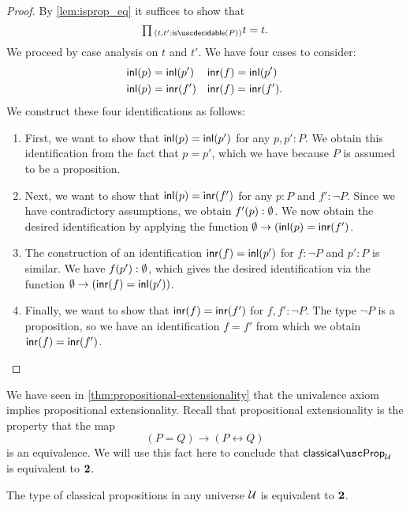 \begin{proof}
  By \cref{lem:isprop_eq} it suffices to show that
  \begin{equation*}
    \prd{t,t':\isdecidable(P)}t=t.
  \end{equation*}
  We proceed by case analysis on $t$ and $t'$. We have four cases to consider:
  \begin{align*}
    {\mathsf{inl}}(p) & ={\mathsf{inl}}(p') & {\mathsf{inr}}(f) & ={\mathsf{inl}}(p') \\
    {\mathsf{inl}}(p) & ={\mathsf{inr}}(f') & {\mathsf{inr}}(f) & ={\mathsf{inr}}(f').
  \end{align*}
  We construct these four identifications as follows:
  \begin{enumerate}
  \item First, we want to show that ${\mathsf{inl}}(p)={\mathsf{inl}}(p')$ for any $p,p':P$. We obtain this identification from the fact that $p=p'$, which we have because $P$ is assumed to be a proposition.
  \item Next, we want to show that ${\mathsf{inl}}(p)={\mathsf{inr}}(f')$ for any $p:P$ and $f':\neg P$. Since we have contradictory assumptions, we obtain $f'(p):\emptyset$. We now obtain the desired identification by applying the function $\emptyset \to ({\mathsf{inl}}(p)={\mathsf{inr}}(f')$.
  \item The construction of an identification ${\mathsf{inr}}(f)={\mathsf{inl}}(p')$ for $f:\neg P$ and $p':P$ is similar. We have $f(p'):\emptyset$, which gives the desired identification via the function $\emptyset\to ({\mathsf{inr}}(f)={\mathsf{inl}}(p'))$.
  \item Finally, we want to show that ${\mathsf{inr}}(f)={\mathsf{inr}}(f')$ for $f,f':\neg P$. The type $\neg P$ is a proposition, so we have an identification $f=f'$ from which we obtain ${\mathsf{inr}}(f)={\mathsf{inr}}(f')$.\qedhere
  \end{enumerate}
\end{proof}

We have seen in \cref{thm:propositional-extensionality} that the univalence axiom implies propositional extensionality. Recall that propositional extensionality is the property that the map
\begin{equation*}
  (P=Q)\to (P\leftrightarrow Q)
\end{equation*}
is an equivalence. We will use this fact here to conclude that $\classicalprop_\UU$ is equivalent to $\mathbf{2}$.

\begin{prp}
  The type of classical propositions in any universe $\mathcal{U}$ is equivalent to $\mathbf{2}$.%
\end{prp}

